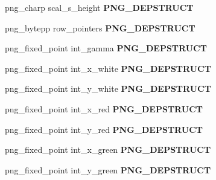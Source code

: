 \begin{DoxyCompactItemize}
\item 
png\+\_\+charp scal\+\_\+s\+\_\+height {\bfseries P\+N\+G\+\_\+\+D\+E\+P\+S\+T\+R\+U\+CT}\hypertarget{structpng__info__struct_a077265d96d7e7b4d5977b93054a38010}{}\label{structpng__info__struct_a077265d96d7e7b4d5977b93054a38010}

\item 
png\+\_\+bytepp row\+\_\+pointers {\bfseries P\+N\+G\+\_\+\+D\+E\+P\+S\+T\+R\+U\+CT}\hypertarget{structpng__info__struct_a521d701ad0c2c0b4728b18e2e12464fc}{}\label{structpng__info__struct_a521d701ad0c2c0b4728b18e2e12464fc}

\item 
png\+\_\+fixed\+\_\+point int\+\_\+gamma {\bfseries P\+N\+G\+\_\+\+D\+E\+P\+S\+T\+R\+U\+CT}\hypertarget{structpng__info__struct_a5437fde83919c461ff10eb512b08ec3c}{}\label{structpng__info__struct_a5437fde83919c461ff10eb512b08ec3c}

\item 
png\+\_\+fixed\+\_\+point int\+\_\+x\+\_\+white {\bfseries P\+N\+G\+\_\+\+D\+E\+P\+S\+T\+R\+U\+CT}\hypertarget{structpng__info__struct_adaeb99562ef4d72ff5fb445609de912f}{}\label{structpng__info__struct_adaeb99562ef4d72ff5fb445609de912f}

\item 
png\+\_\+fixed\+\_\+point int\+\_\+y\+\_\+white {\bfseries P\+N\+G\+\_\+\+D\+E\+P\+S\+T\+R\+U\+CT}\hypertarget{structpng__info__struct_a3266b988d9df7cbfef9d12e7039e04e1}{}\label{structpng__info__struct_a3266b988d9df7cbfef9d12e7039e04e1}

\item 
png\+\_\+fixed\+\_\+point int\+\_\+x\+\_\+red {\bfseries P\+N\+G\+\_\+\+D\+E\+P\+S\+T\+R\+U\+CT}\hypertarget{structpng__info__struct_a43e982fd45e5e3984df93e41ee4c2229}{}\label{structpng__info__struct_a43e982fd45e5e3984df93e41ee4c2229}

\item 
png\+\_\+fixed\+\_\+point int\+\_\+y\+\_\+red {\bfseries P\+N\+G\+\_\+\+D\+E\+P\+S\+T\+R\+U\+CT}\hypertarget{structpng__info__struct_a1ad93175b3119ab529ba4e03f4cbda05}{}\label{structpng__info__struct_a1ad93175b3119ab529ba4e03f4cbda05}

\item 
png\+\_\+fixed\+\_\+point int\+\_\+x\+\_\+green {\bfseries P\+N\+G\+\_\+\+D\+E\+P\+S\+T\+R\+U\+CT}\hypertarget{structpng__info__struct_a093e71129f4594f44c3b6748d729f0a6}{}\label{structpng__info__struct_a093e71129f4594f44c3b6748d729f0a6}

\item 
png\+\_\+fixed\+\_\+point int\+\_\+y\+\_\+green {\bfseries P\+N\+G\+\_\+\+D\+E\+P\+S\+T\+R\+U\+CT}\hypertarget{structpng__info__struct_a3fcab9540bfc88288767640e9fb20cf8}{}\label{structpng__info__struct_a3fcab9540bfc88288767640e9fb20cf8}


\end{DoxyCompactItemize}
